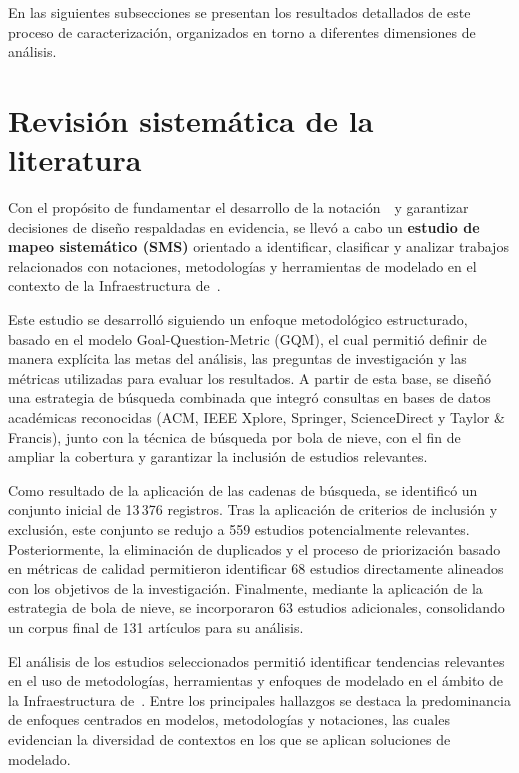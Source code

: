 En las siguientes subsecciones se presentan los resultados detallados de este proceso de caracterización, organizados en torno a diferentes dimensiones de análisis.

\section{Revisión sistemática de la literatura}
\noindent

Con el propósito de fundamentar el desarrollo de la notación~\NDITI~y garantizar decisiones de diseño respaldadas en evidencia, se llevó a cabo un \textbf{estudio de mapeo sistemático (SMS)} orientado a identificar, clasificar y analizar trabajos relacionados con notaciones, metodologías y herramientas de modelado en el contexto de la Infraestructura de~\TI.

Este estudio se desarrolló siguiendo un enfoque metodológico estructurado, basado en el modelo Goal-Question-Metric (GQM), el cual permitió definir de manera explícita las metas del análisis, las preguntas de investigación y las métricas utilizadas para evaluar los resultados. A partir de esta base, se diseñó una estrategia de búsqueda combinada que integró consultas en bases de datos académicas reconocidas (ACM, IEEE Xplore, Springer, ScienceDirect y Taylor \& Francis), junto con la técnica de búsqueda por bola de nieve, con el fin de ampliar la cobertura y garantizar la inclusión de estudios relevantes.

Como resultado de la aplicación de las cadenas de búsqueda, se identificó un conjunto inicial de 13\,376 registros. Tras la aplicación de criterios de inclusión y exclusión, este conjunto se redujo a 559 estudios potencialmente relevantes. Posteriormente, la eliminación de duplicados y el proceso de priorización basado en métricas de calidad permitieron identificar 68 estudios directamente alineados con los objetivos de la investigación. Finalmente, mediante la aplicación de la estrategia de bola de nieve, se incorporaron 63 estudios adicionales, consolidando un corpus final de 131 artículos para su análisis.

El análisis de los estudios seleccionados permitió identificar tendencias relevantes en el uso de metodologías, herramientas y enfoques de modelado en el ámbito de la Infraestructura de~\TI. Entre los principales hallazgos se destaca la predominancia de enfoques centrados en modelos, metodologías y notaciones, las cuales evidencian la diversidad de contextos en los que se aplican soluciones de modelado.

